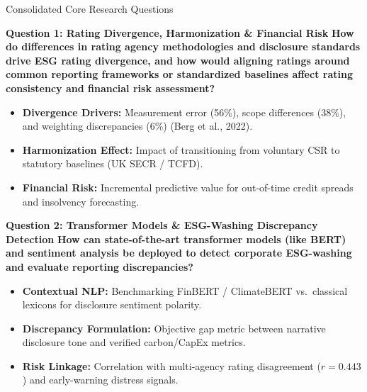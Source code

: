 \documentclass[aspectratio=169,11pt]{beamer}
\begin{document}
\begin{frame}[t]{Consolidated Core Research Questions}
\small
\begin{block}{\textbf{Question 1: Rating Divergence, Harmonization \& Financial Risk}}
\textbf{How do differences in rating agency methodologies and disclosure standards drive ESG rating divergence, and how would aligning ratings around common reporting frameworks or standardized baselines affect rating consistency and financial risk assessment?}
\vspace{3pt}
\begin{itemize}\setlength{\itemsep}{1pt}
  \item \textbf{Divergence Drivers:} Measurement error (56\%), scope differences (38\%), and weighting discrepancies (6\%) (Berg et al., 2022).
  \item \textbf{Harmonization Effect:} Impact of transitioning from voluntary CSR to statutory baselines (UK SECR / TCFD).
  \item \textbf{Financial Risk:} Incremental predictive value for out-of-time credit spreads and insolvency forecasting.
\end{itemize}
\end{block}
\vspace{3pt}
\begin{exampleblock}{\textbf{Question 2: Transformer Models \& ESG-Washing Discrepancy Detection}}
\textbf{How can state-of-the-art transformer models (like BERT) and sentiment analysis be deployed to detect corporate ESG-washing and evaluate reporting discrepancies?}
\vspace{3pt}
\begin{itemize}\setlength{\itemsep}{1pt}
  \item \textbf{Contextual NLP:} Benchmarking FinBERT / ClimateBERT vs.\ classical lexicons for disclosure sentiment polarity.
  \item \textbf{Discrepancy Formulation:} Objective gap metric between narrative disclosure tone and verified carbon/CapEx metrics.
  \item \textbf{Risk Linkage:} Correlation with multi-agency rating disagreement ($r=0.443$) and early-warning distress signals.
\end{itemize}
\end{exampleblock}
\end{frame}
\end{document}
